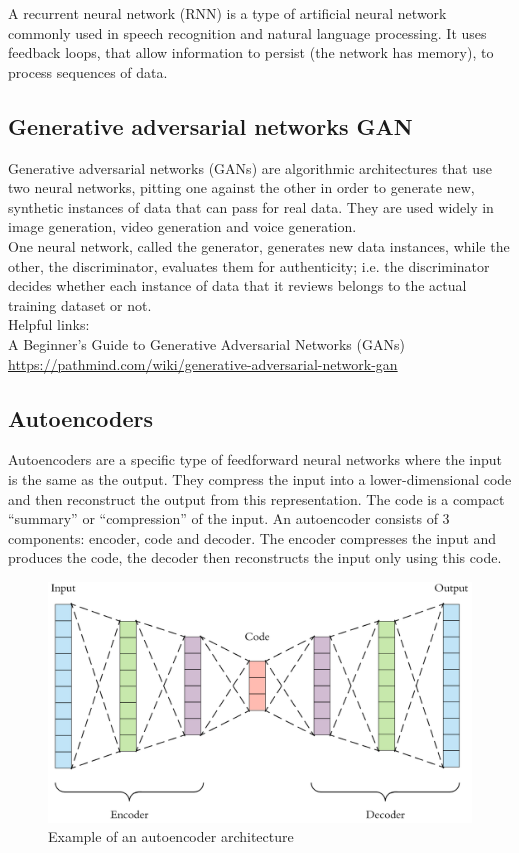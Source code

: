 A recurrent neural network (RNN) is a type of artificial neural network commonly used in speech recognition and natural language processing. It uses feedback loops, that allow information to persist (the network has memory), to process sequences of data.

\subsection{Generative adversarial networks GAN}

Generative adversarial networks (GANs) are algorithmic architectures that use two neural networks, pitting one against the other in order to generate new, synthetic instances of data that can pass for real data. They are used widely in image generation, video generation and voice generation.\\
One neural network, called the generator, generates new data instances, while the other, the discriminator, evaluates them for authenticity; i.e. the discriminator decides whether each instance of data that it reviews belongs to the actual training dataset or not.\\
Helpful links:\\
A Beginner's Guide to Generative Adversarial Networks (GANs)
\\
\url{https://pathmind.com/wiki/generative-adversarial-network-gan}


\subsection{Autoencoders}

Autoencoders are a specific type of feedforward neural networks where the input is the same as the output. They compress the input into a lower-dimensional code and then reconstruct the output from this representation. The code is a compact “summary” or “compression” of the input.
An autoencoder consists of 3 components: encoder, code and decoder. The encoder compresses the input and produces the code, the decoder then reconstructs the input only using this code.

\begin{figure}[hbtp]
	\centering
	\includegraphics[width=1\textwidth]{Images/Autoencoder}
	\caption{Example of an autoencoder architecture}
\end{figure}

